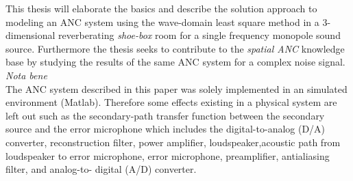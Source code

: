 This thesis will elaborate the basics and describe the solution approach to modeling an ANC system using the wave-domain least square method in a 3-dimensional reverberating \textit{shoe-box} room for a single frequency monopole sound source. Furthermore the thesis seeks to contribute to the \textit{spatial ANC} knowledge base by studying the results of the same ANC system for a complex noise signal.\\


\textit{Nota bene}\\
The ANC system described in this paper was solely implemented in an simulated environment (Matlab). Therefore some effects existing in a physical system are left out such as the secondary-path transfer function between the secondary source and the error microphone which includes the digital-to-analog (D/A) converter, reconstruction filter, power amplifier, loudspeaker,acoustic path from loudspeaker to error microphone, error microphone, preamplifier, antialiasing filter, and analog-to- digital (A/D) converter.\cite{Kuo1999}


